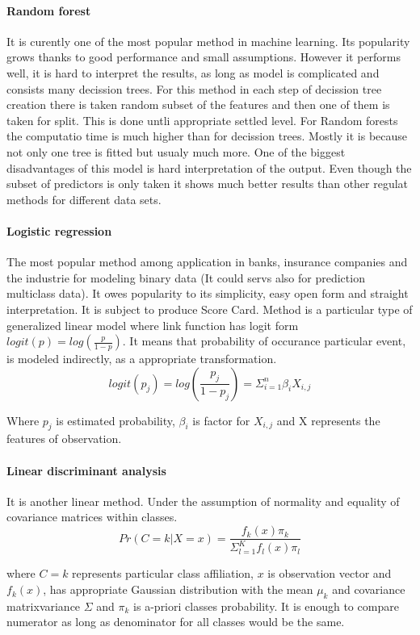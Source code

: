 \documentclass[10pt]{article}\usepackage[]{graphicx}\usepackage[]{color}
\begin{document}
\paragraph{Random forest}
It is curently one of the most popular method in machine learning. Its popularity 
grows thanks to good performance and small assumptions. 
However it performs well, it is hard to interpret the results, as long as model 
is complicated and consists many decission trees. 
For this method in each step of decission tree creation there is taken random 
subset of the features and then one of them is taken for split. This is done 
untli appropriate settled level. 
For Random forests the computatio time is much higher than for decission trees. 
Mostly it is because not only one tree is fitted but usualy much more. 
One of the biggest disadvantages of this model is hard interpretation of the 
output. 
Even though the subset of predictors is only taken it shows much better results
than other regulat methods for different data sets.
\paragraph{Logistic regression}
The most popular method among application in banks, insurance companies and the
industrie for modeling binary data (It could servs also for prediction 
multiclass data). It owes popularity to its simplicity, easy open form and
straight interpretation. It is subject to produce Score Card.
Method is a particular type of generalized linear model where link function has 
logit form $logit(p) = log(\frac{p}{1-p})$. It means that probability of 
occurance particular event, is modeled indirectly, as a appropriate 
transformation. 
$$ logit(p_j) = log(\frac{p_j}{1-p_j}) = \Sigma_{i=1}^{n}\beta_i X_{i,j} $$
  
Where $p_j$ is estimated probability, $\beta_i$ is factor for $X_{i,j}$ and X
represents the features of observation. 
\paragraph{Linear discriminant analysis}
It is another linear method. Under the assumption of normality and equality of 
covariance matrices within classes.
$$
  Pr(C=k|X=x) = \frac{f_k(x)\pi_k}{\Sigma_{l=1}^K f_l(x)\pi_l}
$$
  
where $C = k$ represents particular class affiliation, $x$ is observation vector 
and $f_k(x)$, has appropriate Gaussian distribution with the mean $\mu_k$ and 
covariance matrixvariance $\Sigma$ and $\pi_k$ is a-priori classes probability. 
It is enough to compare numerator as long as denominator for all classes would 
be the same.
 
\end{document}
